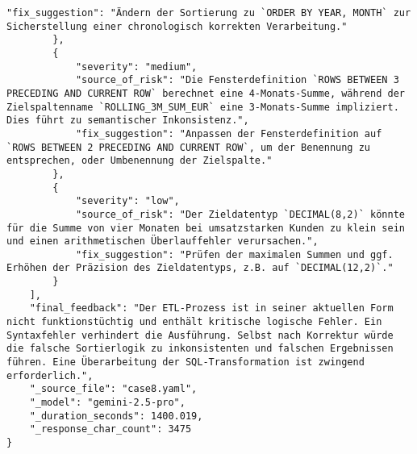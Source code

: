 \begin{lstlisting}[caption={Ausgabe: Gemini 2.5 Pro Anwendungsfall 8 Hauptdurchlauf},label={gemini_case8_prompt1}]
            "fix_suggestion": "Ändern der Sortierung zu `ORDER BY YEAR, MONTH` zur Sicherstellung einer chronologisch korrekten Verarbeitung."
        },
        {
            "severity": "medium",
            "source_of_risk": "Die Fensterdefinition `ROWS BETWEEN 3 PRECEDING AND CURRENT ROW` berechnet eine 4-Monats-Summe, während der Zielspaltenname `ROLLING_3M_SUM_EUR` eine 3-Monats-Summe impliziert. Dies führt zu semantischer Inkonsistenz.",
            "fix_suggestion": "Anpassen der Fensterdefinition auf `ROWS BETWEEN 2 PRECEDING AND CURRENT ROW`, um der Benennung zu entsprechen, oder Umbenennung der Zielspalte."
        },
        {
            "severity": "low",
            "source_of_risk": "Der Zieldatentyp `DECIMAL(8,2)` könnte für die Summe von vier Monaten bei umsatzstarken Kunden zu klein sein und einen arithmetischen Überlauffehler verursachen.",
            "fix_suggestion": "Prüfen der maximalen Summen und ggf. Erhöhen der Präzision des Zieldatentyps, z.B. auf `DECIMAL(12,2)`."
        }
    ],
    "final_feedback": "Der ETL-Prozess ist in seiner aktuellen Form nicht funktionstüchtig und enthält kritische logische Fehler. Ein Syntaxfehler verhindert die Ausführung. Selbst nach Korrektur würde die falsche Sortierlogik zu inkonsistenten und falschen Ergebnissen führen. Eine Überarbeitung der SQL-Transformation ist zwingend erforderlich.",
    "_source_file": "case8.yaml",
    "_model": "gemini-2.5-pro",
    "_duration_seconds": 1400.019,
    "_response_char_count": 3475
}
\end{lstlisting}


